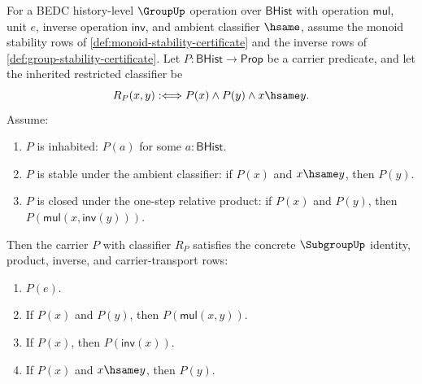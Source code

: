 \begin{theorem}
\label{thm:subgroup-one-step-criterion}
For a BEDC history-level $\GroupUp$ operation over $\mathsf{BHist}$ with operation $\mathsf{mul}$, unit $e$, inverse operation $\mathsf{inv}$, and ambient classifier $\hsame$, assume the monoid stability rows of \autoref{def:monoid-stability-certificate} and the inverse rows of \autoref{def:group-stability-certificate}. Let $P:\mathsf{BHist}\to\mathsf{Prop}$ be a carrier predicate, and let the inherited restricted classifier be
$$
R_P(x,y):\Longleftrightarrow P(x)\land P(y)\land x\hsame y.
$$
Assume:
\begin{enumerate}
\item $P$ is inhabited: $P(a)$ for some $a:\mathsf{BHist}$.
\item $P$ is stable under the ambient classifier: if $P(x)$ and $x\hsame y$, then $P(y)$.
\item $P$ is closed under the one-step relative product: if $P(x)$ and $P(y)$, then $P(\mathsf{mul}(x,\mathsf{inv}(y)))$.
\end{enumerate}
Then the carrier $P$ with classifier $R_P$ satisfies the concrete $\SubgroupUp$ identity, product, inverse, and carrier-transport rows:
\begin{enumerate}
\item $P(e)$.
\item If $P(x)$ and $P(y)$, then $P(\mathsf{mul}(x,y))$.
\item If $P(x)$, then $P(\mathsf{inv}(x))$.
\item If $P(x)$ and $x\hsame y$, then $P(y)$.
\end{enumerate}
\end{theorem}
